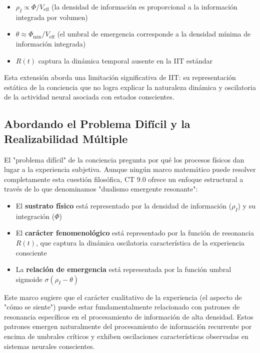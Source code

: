 \documentclass[12pt]{article}
\begin{document}
\begin{itemize}
    \item $\rho_I \propto \Phi / V_{\text{eff}}$ (la densidad de información es proporcional a la información integrada por volumen)
    \item $\theta \approx \Phi_{\text{min}} / V_{\text{eff}}$ (el umbral de emergencia corresponde a la densidad mínima de información integrada)
    \item $R(t)$ captura la dinámica temporal ausente en la IIT estándar
\end{itemize}

Esta extensión aborda una limitación significativa de IIT: su representación estática de la conciencia que no logra explicar la naturaleza dinámica y oscilatoria de la actividad neural asociada con estados conscientes.

\subsection{Abordando el Problema Difícil y la Realizabilidad Múltiple}
El "problema difícil" de la conciencia \cite{chalmers1995} pregunta por qué los procesos físicos dan lugar a la experiencia subjetiva. Aunque ningún marco matemático puede resolver completamente esta cuestión filosófica, CT 9.0 ofrece un enfoque estructural a través de lo que denominamos "dualismo emergente resonante":

\begin{itemize}
    \item El \textbf{sustrato físico} está representado por la densidad de información ($\rho_I$) y su integración ($\Phi$)
    
    \item El \textbf{carácter fenomenológico} está representado por la función de resonancia $R(t)$, que captura la dinámica oscilatoria característica de la experiencia consciente
    
    \item La \textbf{relación de emergencia} está representada por la función umbral sigmoide $\sigma(\rho_I - \theta)$
\end{itemize}

Este marco sugiere que el carácter cualitativo de la experiencia (el aspecto de "cómo se siente") puede estar fundamentalmente relacionado con patrones de resonancia específicos en el procesamiento de información de alta densidad. Estos patrones emergen naturalmente del procesamiento de información recurrente por encima de umbrales críticos y exhiben oscilaciones características observadas en sistemas neurales conscientes.
\end{document}
